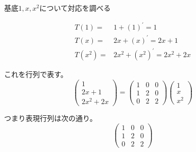 \documentclass[12pt,b5paper]{ltjsarticle}
\begin{document}
\begin{enumerate}
      \dotfill

      基底$1,x,x^2$について対応を調べる

      \begin{align}
       T(1) =& 1 + (1)^{\prime} =1\\
       T(x) =& 2x + (x)^{\prime} =2x+1\\
       T(x^2) =& 2x^2 + (x^2)^{\prime} =2x^2+2x
      \end{align}

      これを行列で表す。
      \begin{equation}
       \begin{pmatrix}
        1\\2x+1\\2x^2+2x
       \end{pmatrix}
       =
       \begin{pmatrix}
        1 & 0 & 0 \\
        1 & 2 & 0 \\
        0 & 2 & 2
       \end{pmatrix}
       \begin{pmatrix}
        1\\x\\x^2
       \end{pmatrix}
      \end{equation}

      つまり表現行列は次の通り。
      \begin{equation}
       \begin{pmatrix}
        1 & 0 & 0 \\
        1 & 2 & 0 \\
        0 & 2 & 2
       \end{pmatrix}
      \end{equation}

      \hrulefill

\end{enumerate}



\hrulefill
\end{document}
